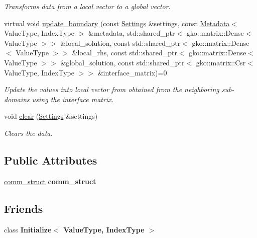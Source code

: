 \begin{DoxyCompactItemize}
\begin{DoxyCompactList}\small\item\em Transforms data from a local vector to a global vector. \end{DoxyCompactList}\item 
virtual void \hyperlink{classschwz_1_1Communicate_a371fb6c61c0bd9b619bbe7e154d18696}{update\+\_\+boundary} (const \hyperlink{structschwz_1_1Settings}{Settings} \&settings, const \hyperlink{structschwz_1_1Metadata}{Metadata}$<$ Value\+Type, Index\+Type $>$ \&metadata, std\+::shared\+\_\+ptr$<$ gko\+::matrix\+::\+Dense$<$ Value\+Type $>$$>$ \&local\+\_\+solution, const std\+::shared\+\_\+ptr$<$ gko\+::matrix\+::\+Dense$<$ Value\+Type $>$$>$ \&local\+\_\+rhs, const std\+::shared\+\_\+ptr$<$ gko\+::matrix\+::\+Dense$<$ Value\+Type $>$$>$ \&global\+\_\+solution, const std\+::shared\+\_\+ptr$<$ gko\+::matrix\+::\+Csr$<$ Value\+Type, Index\+Type $>$$>$ \&interface\+\_\+matrix)=0
\begin{DoxyCompactList}\small\item\em Update the values into local vector from obtained from the neighboring sub-\/domains using the interface matrix. \end{DoxyCompactList}\item 
\mbox{\label{classschwz_1_1Communicate_ac01c45763b2945b0c361b49c7305b142}} 
void \hyperlink{classschwz_1_1Communicate_ac01c45763b2945b0c361b49c7305b142}{clear} (\hyperlink{structschwz_1_1Settings}{Settings} \&settings)
\begin{DoxyCompactList}\small\item\em Clears the data. \end{DoxyCompactList}\end{DoxyCompactItemize}
\subsection*{Public Attributes}
\begin{DoxyCompactItemize}
\item 
\mbox{\label{classschwz_1_1Communicate_ab9c6c68bfa363819322189192ca014aa}} 
\hyperlink{structschwz_1_1Communicate_1_1comm__struct}{comm\+\_\+struct} {\bfseries comm\+\_\+struct}
\end{DoxyCompactItemize}
\subsection*{Friends}
\begin{DoxyCompactItemize}
\item 
\mbox{\label{classschwz_1_1Communicate_a7044b349fe5363eeace2d1a56b38f650}} 
class {\bfseries Initialize$<$ Value\+Type, Index\+Type $>$}
\end{DoxyCompactItemize}


